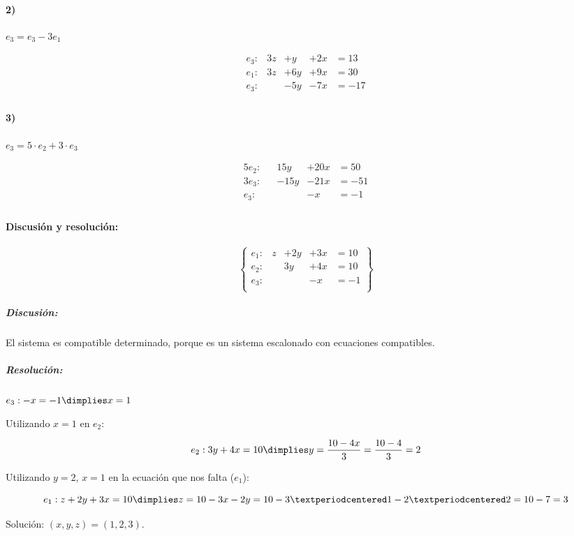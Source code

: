 \documentclass[palatino,nosec,nochap]{Docencia}
\begin{document}
\begin{problem}
\paragraph{2)} $e_3 = e_3-3e_1$

\[
\begin{array}{rcccl}
e_3: & 3z&+y  &+2x&=13\\
e_1: & 3z&+6y &+9x&=30\\
\hline
e_3: &   &-5y &-7x&=-17\\
\end{array}
\]	



\paragraph{3)} $e_3=5·e_2+3·e_3$

\[
\begin{array}{rcccl}
5e_2: & &15y&+20x&=50\\
3e_3: & &-15y&-21x&=-51\\
\hline
e_3: &&&-x&=-1\\
\end{array}
\]	


\paragraph{Discusión y resolución:}

\[
\left\{\begin{array}{lccccc}
e_1: & z&+ 2y&+3x &=10\\
e_2: & &3y&+4x&=10\\
e_3: &&&-x&=-1\\
\end{array}\right\}
\]

\subparagraph{Discusión:} El sistema es compatible determinado, porque es un sistema escalonado con ecuaciones compatibles.


\subparagraph{Resolución:}

$e_3: -x=-1 \dimplies x=1$

Utilizando $x=1$ en $e_2$:


\[
	e_2: 3y+4x=10 \dimplies y=\frac{10-4x}{3} = \frac{10-4}{3} = 2
\]

Utilizando $y=2$, $x=1$ en la ecuación que nos falta ($e_1$):

\[
e_1: z+2y+3x = 10 \dimplies z = 10-3x-2y = 10-3·1-2·2 = 10-7 = 3
\]


Solución: $(x,y,z) = (1,2,3)$.


\end{problem}
\end{document}
